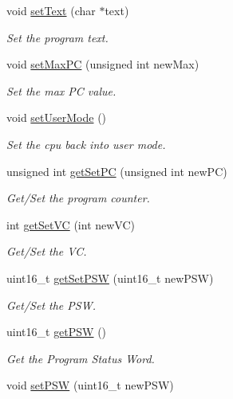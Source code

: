 \begin{DoxyCompactItemize}
\item 
void \hyperlink{classcCPU_acd957640be8abb7c0d8a24010ed0e737}{set\-Text} (char $\ast$text)
\begin{DoxyCompactList}\small\item\em \-Set the program text. \end{DoxyCompactList}\item 
void \hyperlink{classcCPU_ab4b62a77df9c4b32a598326e4ec0ca41}{set\-Max\-P\-C} (unsigned int new\-Max)
\begin{DoxyCompactList}\small\item\em \-Set the max \-P\-C value. \end{DoxyCompactList}\item 
void \hyperlink{classcCPU_a176eb207069b99c47ddec6b466d1a92b}{set\-User\-Mode} ()
\begin{DoxyCompactList}\small\item\em \-Set the cpu back into user mode. \end{DoxyCompactList}\item 
unsigned int \hyperlink{classcCPU_ab04938ac939d530e521181db6a52944f}{get\-Set\-P\-C} (unsigned int new\-P\-C)
\begin{DoxyCompactList}\small\item\em \-Get/\-Set the program counter. \end{DoxyCompactList}\item 
int \hyperlink{classcCPU_a2d593a0d3d66e532826db4754d5fc4d2}{get\-Set\-V\-C} (int new\-V\-C)
\begin{DoxyCompactList}\small\item\em \-Get/\-Set the \-V\-C. \end{DoxyCompactList}\item 
uint16\-\_\-t \hyperlink{classcCPU_a0b13774a76c6b04d760b8ff072c37a85}{get\-Set\-P\-S\-W} (uint16\-\_\-t new\-P\-S\-W)
\begin{DoxyCompactList}\small\item\em \-Get/\-Set the \-P\-S\-W. \end{DoxyCompactList}\item 
uint16\-\_\-t \hyperlink{classcCPU_ad485374a709476e2dfb847046d3d5215}{get\-P\-S\-W} ()
\begin{DoxyCompactList}\small\item\em \-Get the \-Program \-Status \-Word. \end{DoxyCompactList}\item 
void \hyperlink{classcCPU_adb6ad793398d28b5615dd1377a619084}{set\-P\-S\-W} (uint16\-\_\-t new\-P\-S\-W)

\end{DoxyCompactItemize}
